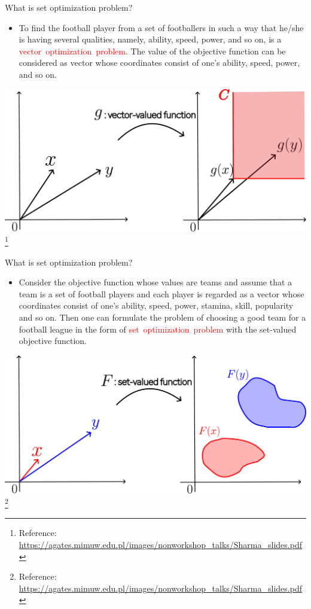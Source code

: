 \documentclass[aspectratio=169, dvipdfmx, 11pt]{beamer}
\begin{document}
\begin{frame}{What is set optimization problem?}
  \begin{itemize}
    \item To find the football player from a set of footballers in such a way that he/she
          is having several qualities, namely, ability, speed, power, and so on,
          is a \textcolor{red}{vector~optimization~problem}. The value of the objective function can be
          considered as vector whose coordinates consist of one's ability, speed, power, and so on.
  \end{itemize}
  \centering
  \includegraphics[keepaspectratio, scale=0.07]{figures/eps/vector_opt.eps}
  \renewcommand{\thefootnote}{\fnsymbol{footnote}}%
  \footnote[0]{Reference: \url{https://agates.mimuw.edu.pl/images/nonworkshop_talks/Sharma_slides.pdf}}
\end{frame}

\begin{frame}{What is set optimization problem?}
  \begin{itemize}
    \item Consider the objective function whose values are teams and assume
          that a team is a set of football players and each player is
          regarded as a vector whose coordinates consist of one's ability,
          speed, power, stamina, skill, popularity and so on. Then one
          can formulate the problem of choosing a good team for a football league in the form
          of \textcolor{red}{set~optimization~problem} with the set-valued objective function.
  \end{itemize}
  \centering
  \includegraphics[keepaspectratio, scale=0.07]{figures/eps/set_opt.eps}
  \renewcommand{\thefootnote}{\fnsymbol{footnote}}%
  \footnote[0]{Reference: \url{https://agates.mimuw.edu.pl/images/nonworkshop_talks/Sharma_slides.pdf}}
\end{frame}
\end{document}
